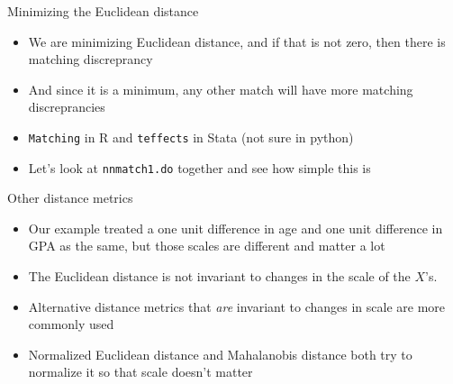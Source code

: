 \documentclass{beamer}
\begin{document}








\begin{frame}{Minimizing the Euclidean distance}

\begin{itemize}
\item We are minimizing Euclidean distance, and if that is not zero, then there is matching discreprancy
\item And since it is a minimum, any other match will have more matching discreprancies
\item \texttt{Matching} in R and \texttt{teffects} in Stata (not sure in python)
\item Let's look at \texttt{nnmatch1.do} together and see how simple this is
\end{itemize}

\end{frame}




 




\begin{frame}{Other distance metrics}

\begin{itemize}
\item Our example treated a one unit difference in age and one unit difference in GPA as the same, but those scales are different and matter a lot
\item The Euclidean distance is not invariant to changes in the scale of the $X$'s.  
\item Alternative distance metrics that \emph{are} invariant to changes in scale are more commonly used 
\item Normalized Euclidean distance and Mahalanobis distance both try to normalize it so that scale doesn't matter
\end{itemize}

\end{frame}
\end{document}
